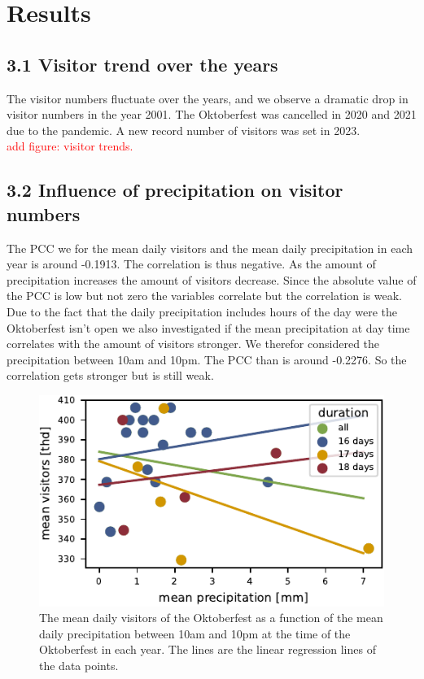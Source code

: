 \documentclass{article}
\theoremstyle{plain}
\theoremstyle{definition}
\theoremstyle{remark}
\begin{document}
\section{Results}\label{sec:results}
\subsection*{3.1 Visitor trend over the years}
The visitor numbers fluctuate over the years, and we observe a dramatic drop in visitor numbers in the year 2001. The Oktoberfest was cancelled in 2020 and 2021 due to the pandemic. A new record number of visitors was set in 2023.\\
\textcolor{red}{add figure: visitor trends.}\\
\subsection*{3.2 Influence of precipitation on visitor numbers}
The PCC we for the mean daily visitors and the mean daily precipitation in each year is around -0.1913. The correlation is thus negative. As the amount of precipitation increases the amount of visitors decrease. Since the absolute value of the PCC is low but not zero the variables correlate but the correlation is weak. Due to the fact that the daily precipitation includes hours of the day were the Oktoberfest isn't open we also investigated if the mean precipitation at day time correlates with the amount of visitors stronger. We therefor considered the precipitation between 10am and 10pm. The PCC than is around -0.2276. So the correlation gets stronger but is still weak.
\begin{figure}[]%
  \includegraphics{fig/totalprecipitation.pdf}
  \caption{The mean daily visitors of the Oktoberfest as a function of the mean daily precipitation between 10am and 10pm at the time of the Oktoberfest in each year. The lines are the linear regression lines of the data points.}
  \label{figure_precipitation}
\end{figure}\\
\end{document}
